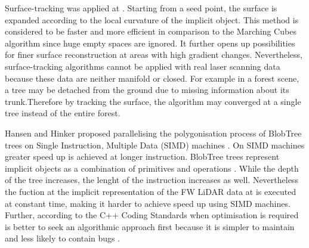 \documentclass{subfiles}
\begin{document}
\par Surface-tracking was applied at \cite{Rodrigues2005} \cite{Hartmann1998}. Starting from a seed point, the surface is expanded according to the local curvature of the implicit object. This method is considered to be faster and more efficient in comparison to the Marching Cubes algorithm since huge empty spaces are ignored. It further opens up possibilities for finer surface reconstruction at areas with high gradient changes. Nevertheless, surface-tracking algorithms cannot be applied with real laser scanning data because these data are neither manifold or closed. For example in a forest scene, a tree may be detached from the ground due to missing information about its trunk.Therefore by tracking the surface, the algorithm may converged at a single tree instead of the entire forest.  

\par Hansen and Hinker proposed parallelising the polygonisation process of BlobTree trees on Single Instruction, Multiple Data (SIMD) machines \cite{Hansen1992}. On SIMD machines greater speed up is achieved at longer instruction. BlobTree trees represent implicit objects as a combination of primitives and operations \cite{Galbraith2004}. While the depth of the tree increases, the lenght of the instruction increases as well. Nevertheless the fuction at the implicit representation of the FW LiDAR data at \cite{Miltiadou2014} is executed at constant time, making it harder to achieve speed up using SIMD machines. Further, according to the C++ Coding Standards when optimisation is required is better to seek an algorithmic approach first because it is simpler to maintain and less likely to contain bugs \cite{Sutter2004}. 
\end{document}
